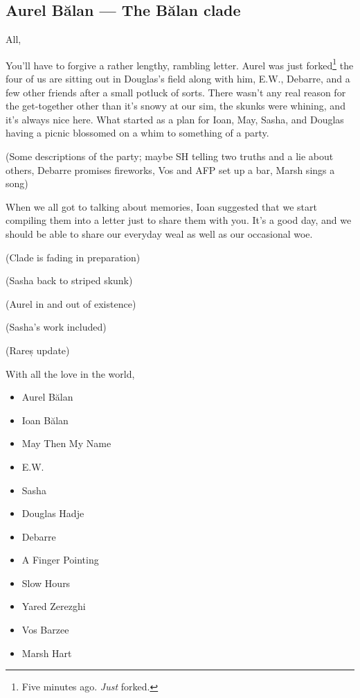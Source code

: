 \hypertarget{aurel-bux103lan-the-bux103lan-clade}{%
\subsection{Aurel Bălan — The Bălan clade}\label{aurel-bux103lan-the-bux103lan-clade}}

All,

You'll have to forgive a rather lengthy, rambling letter. Aurel was just forked\footnote{Five minutes ago. \emph{Just} forked.} the four of us are sitting out in Douglas's field along with him, E.W., Debarre, and a few other friends after a small potluck of sorts. There wasn't any real reason for the get-together other than it's snowy at our sim, the skunks were whining, and it's always nice here. What started as a plan for Ioan, May, Sasha, and Douglas having a picnic blossomed on a whim to something of a party.

(Some descriptions of the party; maybe SH telling two truths and a lie about others, Debarre promises fireworks, Vos and AFP set up a bar, Marsh sings a song)

When we all got to talking about memories, Ioan suggested that we start compiling them into a letter just to share them with you. It's a good day, and we should be able to share our everyday weal as well as our occasional woe.

(Clade is fading in preparation)

(Sasha back to striped skunk)

(Aurel in and out of existence)

(Sasha's work included)

(Rareș update)

With all the love in the world,

\begin{itemize}
\tightlist
\item
  Aurel Bălan
\item
  Ioan Bălan
\item
  May Then My Name
\item
  E.W.
\item
  Sasha
\item
  Douglas Hadje
\item
  Debarre
\item
  A Finger Pointing
\item
  Slow Hours
\item
  Yared Zerezghi
\item
  Vos Barzee
\item
  Marsh Hart
\end{itemize}
